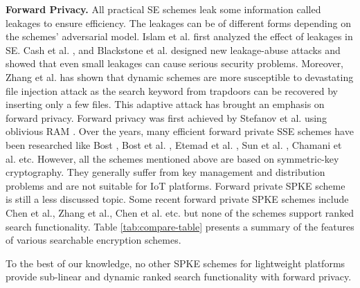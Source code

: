 \documentclass[sigconf,pdftex]{acmart}
\begin{document}
\textbf{Forward Privacy.} All practical SE schemes leak some information called leakages to ensure efficiency. The leakages can be of different forms depending on the schemes' adversarial model. Islam et al. \cite{Islam2012AccessPD} first analyzed the effect of leakages in SE. Cash et al. \cite{cash2015leakage}, and Blackstone et al. \cite{blackstone2020revisiting} designed new leakage-abuse attacks and showed that even small leakages can cause serious security problems. Moreover, Zhang et al. \cite{197239} has shown that dynamic schemes are more susceptible to devastating file injection attack as the search keyword from trapdoors can be recovered by inserting only a few files. This adaptive attack has brought an emphasis on forward privacy. Forward privacy was first achieved by Stefanov et al. using oblivious RAM \cite{stefanov2014practical}. Over the years, many efficient forward private SSE schemes have been researched like Bost \cite{Bost:2016:FSS:2976749.2978303}, Bost et al. \cite{bost2017forward}, Etemad et al. \cite{etemad2018efficient}, Sun et al. \cite{sun2018practical}, Chamani et al. \cite{chamani2018new} etc. However, all the schemes mentioned above are based on symmetric-key cryptography. They generally suffer from key management and distribution problems and are not suitable for IoT platforms. Forward private SPKE scheme is still a less discussed topic. Some recent forward private SPKE schemes include Chen et al.\cite{chen2019lightweight}, Zhang et al.\cite{zhang2019fs}, Chen et al. \cite{chen2020a} etc. but none of the schemes support ranked search functionality. Table \ref{tab:compare-table} presents a summary of the features of various searchable encryption schemes.

To the best of our knowledge, no other SPKE schemes for lightweight platforms provide sub-linear and dynamic ranked search functionality with forward privacy.

\end{document}
